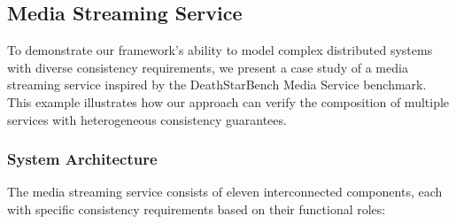 %
%
%

\subsection{Media Streaming Service}

To demonstrate our framework's ability to model complex distributed
systems with diverse consistency requirements, we present a case
study of a media streaming service inspired by the DeathStarBench
Media Service benchmark. This example illustrates how our approach
\cite{gan2019an}
can verify the composition of multiple services with heterogeneous
consistency guarantees.

\subsubsection{System Architecture}

The media streaming service consists of eleven interconnected
components, each with specific consistency requirements based on
their functional roles:

